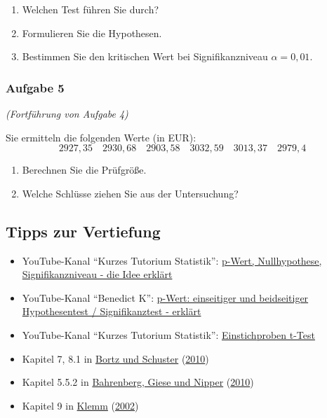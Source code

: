 \documentclass[
  ngerman,
]{article}
\providecommand{\tightlist}{%
  \setlength{\itemsep}{0pt}\setlength{\parskip}{0pt}}
\begin{document}
\begin{enumerate}
\def\labelenumi{\alph{enumi})}
\tightlist
\item
  Welchen Test führen Sie durch?
\item
  Formulieren Sie die Hypothesen.
\item
  Bestimmen Sie den kritischen Wert bei Signifikanzniveau \(\alpha=0{,}01\).
\end{enumerate}

\hypertarget{aufgabe-5}{%
\subsubsection{Aufgabe 5}\label{aufgabe-5}}

\emph{(Fortführung von Aufgabe 4)}

Sie ermitteln die folgenden Werte (in EUR):
\[
2927,35\quad2930,68\quad2903,58\quad3032,59\quad3013,37\quad2979,4
\]

\begin{enumerate}
\def\labelenumi{\alph{enumi})}
\tightlist
\item
  Berechnen Sie die Prüfgröße.
\item
  Welche Schlüsse ziehen Sie aus der Untersuchung?
\end{enumerate}

\hypertarget{tipps-zur-vertiefung-4}{%
\subsection{Tipps zur Vertiefung}\label{tipps-zur-vertiefung-4}}

\begin{itemize}
\tightlist
\item
  YouTube-Kanal ``Kurzes Tutorium Statistik'': \href{https://www.youtube.com/watch?v=gSyGVDMcg-U}{p-Wert, Nullhypothese, Signifikanzniveau - die Idee erklärt}
\item
  YouTube-Kanal ``Benedict K'': \href{https://www.youtube.com/watch?v=sNlxShUM4io}{p-Wert: einseitiger und beidseitiger Hypothesentest / Signifikanztest - erklärt}
\item
  YouTube-Kanal ``Kurzes Tutorium Statistik'': \href{https://www.youtube.com/watch?v=rbYg5IsOYaM}{Einstichproben t-Test}
\item
  Kapitel 7, 8.1 in \protect\hyperlink{ref-bortz}{Bortz und Schuster} (\protect\hyperlink{ref-bortz}{2010})
\item
  Kapitel 5.5.2 in \protect\hyperlink{ref-bahrenberg}{Bahrenberg, Giese und Nipper} (\protect\hyperlink{ref-bahrenberg}{2010})
\item
  Kapitel 9 in \protect\hyperlink{ref-klemm}{Klemm} (\protect\hyperlink{ref-klemm}{2002})
\end{itemize}
\end{document}
